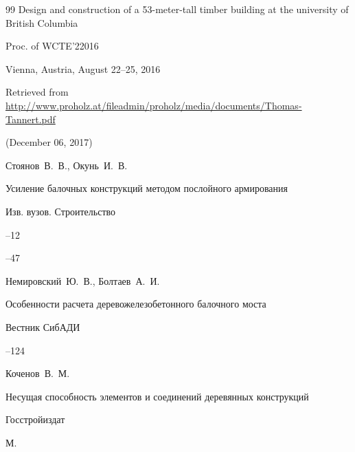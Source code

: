 \begin{thebibliography}{99}
\paper Design and construction of a 53-meter-tall timber building at the university of British Columbia

\inbook Proc. of WCTE'22016



\procinfo  Vienna, Austria, August 22--25, 2016

\elink Retrieved from \url{http://www.proholz.at/fileadmin/proholz/media/documents/Thomas-Tannert.pdf}

(December 06, 2017) 




\by Стоянов~В.~В., Окунь~И.~В.

\paper Усиление балочных конструкций методом послойного армирования

\jour Изв. вузов. Строительство


--12

--47










\by Немировский~Ю.~В., Болтаев~А.~И.

\paper Особенности расчета деревожелезобетонного балочного моста

\jour Вестник СибАДИ



--124









\by Коченов~В.~М.

\book Несущая способность элементов и соединений деревянных конструкций 


\publ Госстройиздат

\publaddr М.





\end{thebibliography}
